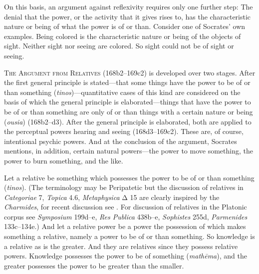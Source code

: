 On this basis, an argument against reflexivity requires only one further step: The denial that the power, or the activity that it gives rises to, has the characteristic nature or being of what the power is of or than. Consider one of Socrates' own examples. Being colored is the characteristic nature or being of the objects of sight. Neither sight nor seeing are colored. So sight could not be of sight or seeing.

\textsc{The Argument from Relatives} (168b2–169c2) is developed over two stages. After the first general principle is stated—that some things have the power to be of or than something (\emph{tinos})—quantitative cases of this kind are considered on the basis of which the general principle is elaborated—things that have the power to be of or than something are only of or than things with a certain nature or being (\emph{ousia}) (168b2–d3). After the general principle is elaborated, both are applied to the perceptual powers hearing and seeing (168d3–169c2). These are, of course, intentional psychic powers. And at the conclusion of the argument, Socrates mentions, in addition, certain natural powers—the power to move something, the power to burn something, and the like.

Let a relative be something which possesses the power to be of or than something (\emph{tinos}). (The terminology may be Peripatetic but the discussion of relatives in \emph{Categoriae} 7, \emph{Topica} 4.6, \emph{Metaphysica} {\sbl Δ} 15 are clearly inspired by the \emph{Charmides}, for recent discussion see \citealt[chapters 5–7]{Duncombe:2020gi}. For discussion of relatives in the Platonic corpus see \emph{Symposium} 199d–e, \emph{Res Publica} 438b–e, \emph{Sophistes} 255d, \emph{Parmenides} 133c–134e.) And let a relative power be a power the possession of which makes something a relative, namely a power to be of or than something. So knowledge is a relative as is the greater. And they are relatives since they possess relative powers. Knowledge possesses the power to be of something (\emph{mathēma}), and the greater possesses the power to be greater than the smaller.

